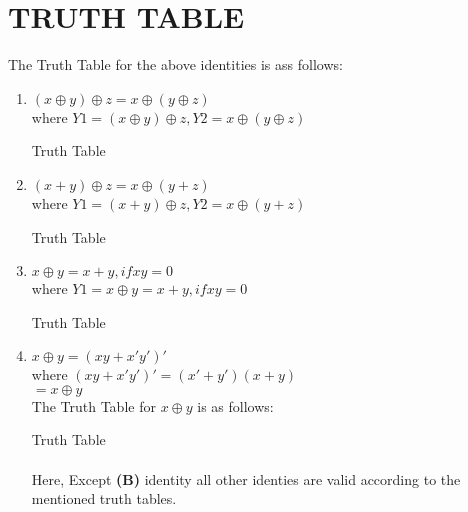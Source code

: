 \documentclass{article}
\begin{document}
\section{TRUTH TABLE}
The Truth Table for the above identities is ass follows:
\begin{enumerate}[label=\textbf{(\Alph*})]
	\item \textbf{$  (x\oplus y)\oplus z = x\oplus(y\oplus z)$} \\
where $Y1=(x\oplus y)\oplus z,Y2=x\oplus(y\oplus z)$\\
\bigskip
\begin{table}[ht!]
	\centering
        
	\caption{Truth Table}
	\label{Table:Truth Table}
\end{table}
\bigskip
\bigskip
	
	\item \textbf{$(x+y)\oplus z=x\oplus(y+z)$}\\
where $Y1=(x+y)\oplus z, Y2=x\oplus(y+z)$\\
\bigskip
\begin{table}[ht!]
	\centering
       
	\caption{Truth Table}
	\label{Table:Truth Table}
\end{table}
\bigskip

	\item \textbf{$x\oplus y = x + y, if xy = 0 $} \\
where $Y1=x\oplus y=x+y, if xy=0$\\
\bigskip
\begin{table}[ht!]
	\centering
      
	\caption{Truth Table} 
	\label{Table:Truth Table}
\end{table}
\bigskip

	\item \textbf{$ x\oplus y = (xy + x'y')'$}\\
		where $(xy+x'y')'=(x'+y')(x+y)$\\
		      $=x\oplus y$\\
The Truth Table for $x\oplus y$ is as follows:\\
\begin{table}[ht!]
	\centering
	 
	\caption{Truth Table} 
	 \label{Table:Truth Table}
\end{table}
\bigskip

\paragraph{}
	Here, Except \textbf{(B)} identity all other identies are valid according to the mentioned truth tables.
\end{enumerate}
\bigskip
\end{document}
